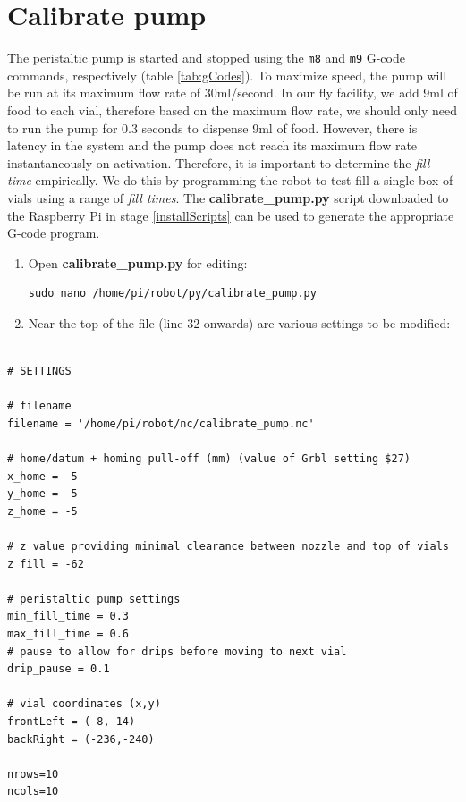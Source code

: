 \documentclass[]{book}
\theoremstyle{definition}
\theoremstyle{definition}
\theoremstyle{remark}
\begin{document}
\section{Calibrate pump}\label{calibratePump}

The peristaltic pump is started and stopped using the \texttt{m8} and
\texttt{m9} G-code commands, respectively (table \ref{tab:gCodes}). To
maximize speed, the pump will be run at its maximum flow rate of
30ml/second. In our fly facility, we add 9ml of food to each vial,
therefore based on the maximum flow rate, we should only need to run the
pump for 0.3 seconds to dispense 9ml of food. However, there is latency
in the system and the pump does not reach its maximum flow rate
instantaneously on activation. Therefore, it is important to determine
the \emph{fill time} empirically. We do this by programming the robot to
test fill a single box of vials using a range of \emph{fill times}. The
\textbf{calibrate\_pump.py} script downloaded to the Raspberry Pi in
stage \ref{installScripts} can be used to generate the appropriate
G-code program.

\begin{enumerate}
\def\labelenumi{\arabic{enumi}.}
\item
  Open \textbf{calibrate\_pump.py} for editing:

\begin{verbatim}
sudo nano /home/pi/robot/py/calibrate_pump.py
\end{verbatim}
\item
  Near the top of the file (line 32 onwards) are various settings to be
  modified:
\end{enumerate}

\begin{verbatim}

# SETTINGS

# filename
filename = '/home/pi/robot/nc/calibrate_pump.nc'

# home/datum + homing pull-off (mm) (value of Grbl setting $27)
x_home = -5
y_home = -5
z_home = -5

# z value providing minimal clearance between nozzle and top of vials
z_fill = -62 

# peristaltic pump settings
min_fill_time = 0.3
max_fill_time = 0.6
# pause to allow for drips before moving to next vial
drip_pause = 0.1 

# vial coordinates (x,y)
frontLeft = (-8,-14)
backRight = (-236,-240)

nrows=10
ncols=10
\end{verbatim}
\end{document}
